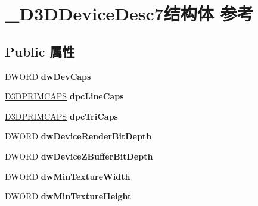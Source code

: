 \hypertarget{struct___d3_d_device_desc7}{}\section{\+\_\+\+D3\+D\+Device\+Desc7结构体 参考}
\label{struct___d3_d_device_desc7}
\subsection*{Public 属性}
\begin{DoxyCompactItemize}
\item 
\mbox{\label{struct___d3_d_device_desc7_aacd1a886933d9f2874530232f6454150}} 
D\+W\+O\+RD {\bfseries dw\+Dev\+Caps}
\item 
\mbox{\label{struct___d3_d_device_desc7_a4c5b5c4c47bf843f35ceb53d109fdb6a}} 
\hyperlink{struct___d3_d_prim_caps}{D3\+D\+P\+R\+I\+M\+C\+A\+PS} {\bfseries dpc\+Line\+Caps}
\item 
\mbox{\label{struct___d3_d_device_desc7_a08a47ecfdfdc531c1430c4ee56b22d39}} 
\hyperlink{struct___d3_d_prim_caps}{D3\+D\+P\+R\+I\+M\+C\+A\+PS} {\bfseries dpc\+Tri\+Caps}
\item 
\mbox{\label{struct___d3_d_device_desc7_a5c38ccc2bda13ce63fcd14b59442e782}} 
D\+W\+O\+RD {\bfseries dw\+Device\+Render\+Bit\+Depth}
\item 
\mbox{\label{struct___d3_d_device_desc7_a8b729ede77ddfed66440e897821281ba}} 
D\+W\+O\+RD {\bfseries dw\+Device\+Z\+Buffer\+Bit\+Depth}
\item 
\mbox{\label{struct___d3_d_device_desc7_ac6709c4b4db6d8a8a44ae74be5147139}} 
D\+W\+O\+RD {\bfseries dw\+Min\+Texture\+Width}
\item 
\mbox{\label{struct___d3_d_device_desc7_a519269a60fda38b2d5a43d55230b2d1c}} 
D\+W\+O\+RD {\bfseries dw\+Min\+Texture\+Height}
\item 
\mbox{\label{struct___d3_d_device_desc7_ad77b88c05d3f504da654a2d7eab3a935}} 

\end{DoxyCompactItemize}
